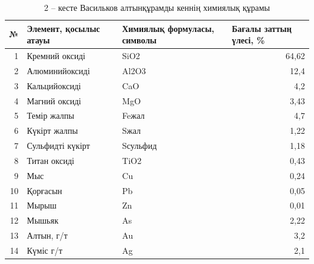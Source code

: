 \begin{table}[H]
\caption*{2 -- кесте Васильков алтынқұрамды кеннің химиялық құрамы}
\centering
\begin{tabular}{|r|l|l|r|}
\hline
\multicolumn{1}{|l|}{№} & Элемент, қосылыс атауы & Химиялық формуласы, символы & \multicolumn{1}{l|}{Бағалы заттың үлесі, \%} \\ \hline
1  & Кремний оксиді   & SiO2     & 64,62 \\ \hline
2  & Алюминийоксиді   & Al2O3    & 12,4  \\ \hline
3  & Кальцийоксиді    & CaO      & 4,2   \\ \hline
4  & Магний оксиді    & MgO      & 3,43  \\ \hline
5  & Темір жалпы      & Feжал    & 4,7   \\ \hline
6  & Күкірт жалпы     & Sжал     & 1,22  \\ \hline
7  & Сульфидті күкірт & Sсульфид & 1,18  \\ \hline
8  & Титан оксиді     & TiO2     & 0,43  \\ \hline
9  & Мыс              & Cu       & 0,24  \\ \hline
10 & Қорғасын         & Pb       & 0,05  \\ \hline
11 & Мырыш            & Zn       & 0,01  \\ \hline
12 & Мышьяк           & As       & 2,22  \\ \hline
13 & Алтын, г/т       & Au       & 3,2   \\ \hline
14 & Күміс г/т        & Ag       & 2,1   \\ \hline
\end{tabular}%
\end{table}
  
  
